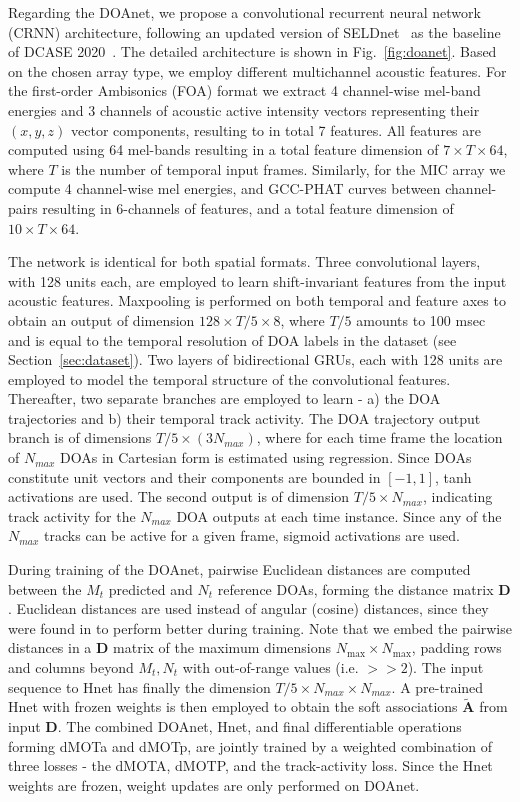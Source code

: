 \documentclass[conference]{IEEEtran}
\def\D {\mathbf{D}}
\def\tA {\tilde{\mathbf{A}}}
\begin{document}
Regarding the DOAnet, we propose a convolutional recurrent neural network (CRNN) architecture, following an updated version of SELDnet~\cite{adavanne2018sound} as the baseline of DCASE 2020~\cite{politis2020dataset}. The detailed architecture is shown in Fig.~\ref{fig:doanet}. Based on the chosen array type, we employ different multichannel acoustic features. For the first-order Ambisonics (FOA) format we extract 4 channel-wise mel-band energies and 3 channels of acoustic active intensity vectors \cite{pulkki2018parametric} representing their $(x, y,z)$ vector components, resulting to in total 7 features. All features are computed using 64 mel-bands resulting in a total feature dimension of $7\times T\times 64$, where $T$ is the number of temporal input frames. Similarly, for the MIC array we compute 4 channel-wise mel energies, and GCC-PHAT curves between channel-pairs resulting in 6-channels of features, and a total feature dimension of $10\times T\times 64$.
        
The network is identical for both spatial formats. Three convolutional layers, with 128 units each, are employed to learn shift-invariant features from the input acoustic features. Maxpooling is performed on both temporal and feature axes to obtain an output of dimension $128\times T/5\times 8$, where $T/5$ amounts to 100 msec and is equal to the temporal resolution of DOA labels in the dataset (see Section~\ref{sec:dataset}). Two layers of bidirectional GRUs, each with 128 units are employed to model the temporal structure of the convolutional features. Thereafter, two separate branches are employed to learn - a) the  DOA trajectories and b) their temporal track activity. The DOA trajectory output branch is of dimensions $T/5 \times(3 N_{max})$, where for each time frame the location of $N_{max}$ DOAs in Cartesian form is estimated using regression. Since DOAs constitute unit vectors and their components are bounded in $[-1,1]$, tanh activations are used. The second output is of dimension $T/5\times N_{max}$, indicating track activity for the $N_{max}$ DOA outputs at each time instance. Since any of the $N_{max}$ tracks can be active for a given frame, sigmoid activations are used.

During training of the DOAnet, pairwise Euclidean distances are computed between the $M_t$ predicted and $N_t$ reference DOAs, forming the distance matrix $\D$. Euclidean distances are used instead of angular (cosine) distances, since they were found in \cite{adavanne2018sound, perotin2019regression} to perform better during training. Note that we embed the pairwise distances in a $\D$ matrix of the maximum dimensions $N_\mathrm{max} \times N_\mathrm{max}$, padding rows and columns beyond $M_t, N_t$ with out-of-range values (i.e. $>>2$). The input sequence to Hnet has finally the dimension $T/5\times N_{max}\times N_{max}$. A pre-trained Hnet with frozen weights is then employed to obtain the soft associations $\tA$ from input $\D$. The combined DOAnet, Hnet, and final differentiable operations forming dMOTa and dMOTp, are jointly trained by a weighted combination of three losses - the dMOTA, dMOTP, and the track-activity loss. Since the Hnet weights are frozen, weight updates are only performed on DOAnet.
\end{document}
